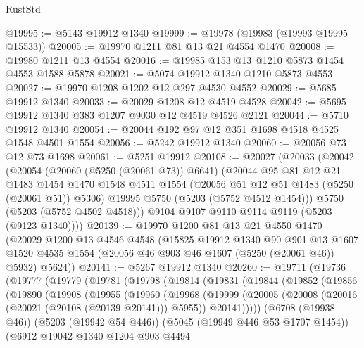 \begin{lexlean}{RustStd}
\begin{coremodule}
@19995 := @5143 @19912 @1340
@19999 := @19978 (@19983 (@19993 @19995 @15533))
@20005 := @19970 @1211 @81 @13 @21 @4554 @1470
@20008 := @19980 @1211 @13 @4554
@20016 := @19985 @153 @13 @1210 @5873 @1454 @4553 @1588 @5878
@20021 := @5074 @19912 @1340 @1210 @5873 @4553
@20027 := @19970 @1208 @1202 @12 @297 @4530 @4552
@20029 := @5685 @19912 @1340
@20033 := @20029 @1208 @12 @4519 @4528
@20042 := @5695 @19912 @1340 @383 @1207 @9030 @12 @4519 @4526 @2121
@20044 := @5710 @19912 @1340
@20054 := @20044 @192 @97 @12 @351 @1698 @4518 @4525 @1548 @4501 @1554
@20056 := @5242 @19912 @1340
@20060 := @20056 @73 @12 @73 @1698
@20061 := @5251 @19912
@20108 := @20027
    (@20033
      (@20042
        (@20054
          (@20060 (@5250 (@20061 @73)) @6641)
          (@20044
            @95
            @81
            @12
            @21
            @1483
            @1454
            @1470
            @1548
            @4511
            @1554
            (@20056 @51 @12 @51 @1483 (@5250 (@20061 @51)) @5306)
            @19995
            @5750
            (@5203 (@5752 @4512 @1454)))
          @5750
          (@5203 (@5752 @4502 @4518)))
        @9104
        @9107
        @9110
        @9114
        @9119
        (@5203 (@9123 @1340))))
@20139 := @19970
    @1200
    @81
    @13
    @21
    @4550
    @1470
    (@20029
      @1200
      @13
      @4546
      @4548
      (@15825
        @19912
        @1340
        @90
        @901
        @13
        @1607
        @1520
        @4535
        @1554
        (@20056 @46 @903 @46 @1607 (@5250 (@20061 @46)) @5932)
        @5624))
@20141 := @5267 @19912 @1340
@20260 := @19711
    (@19736
      (@19777
        (@19779
          (@19781
            (@19798
              (@19814
                (@19831
                  (@19844
                    (@19852
                      (@19856
                        (@19890
                          (@19908
                            (@19955
                              (@19960
                                (@19968
                                  (@19999
                                    (@20005
                                      (@20008 (@20016 (@20021 (@20108 (@20139 @20141))) @5955))
                                      @20141)))))
                            (@6708 (@19938 @46))
                            (@5203 (@19942 @54 @446))
                            (@5045 (@19949 @446 @53 @1707 @1454))
                            (@6912
                              @19042
                              @1340
                              @1204
                              @903
                              @4494

\end{coremodule}
\end{lexlean}
